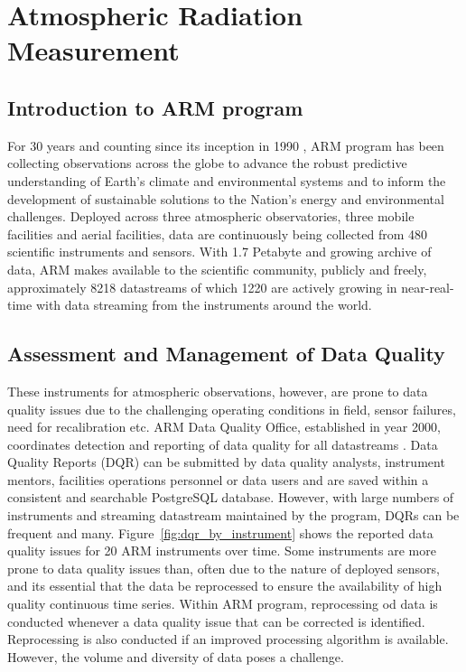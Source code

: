 \section{Atmospheric Radiation Measurement}
\subsection{Introduction to ARM program}
For 30 years and counting since its inception in 1990
\cite{Turner_AMS_2016}, ARM program has
been collecting observations across the globe to advance the robust
predictive understanding of Earth's climate and environmental systems
and to inform the development of sustainable solutions to the Nation's
energy and environmental challenges. Deployed across three atmospheric
observatories, three mobile facilities and aerial facilities, data are
continuously being collected from 480 scientific instruments and
sensors. With 1.7 Petabyte and growing archive of data, ARM makes
available to the scientific community, publicly and freely,
approximately 8218 datastreams of which 1220 are actively growing in
near-real-time with data streaming from the instruments around the
world. 

\subsection{Assessment and Management of Data Quality}
These instruments for atmospheric observations, however, are prone to data quality issues due to
the challenging operating conditions in field, sensor failures, need for
recalibration etc. ARM Data Quality Office, established in year 2000,
coordinates detection and reporting of data quality for all datastreams
\cite{Peppler_AMS_2016}.
Data Quality Reports (DQR) can be submitted by data quality analysts,
instrument mentors, facilities operations personnel or data users and
are saved within a consistent and searchable PostgreSQL database.
However, with large numbers of instruments and streaming datastream
maintained by the program, DQRs can be frequent and many. 
Figure~\ref{fig:dqr_by_instrument} shows the reported data quality
issues for 20 ARM instruments over time. Some instruments are more prone
to data quality issues than, often due to the nature of deployed
sensors, and its essential that the data be reprocessed to ensure the
availability of high quality continuous time series. Within ARM program,
reprocessing od data is conducted whenever a data quality issue that can
be corrected is identified. Reprocessing is also conducted if an
improved processing algorithm is available. However, the volume and
diversity of data poses a challenge.

